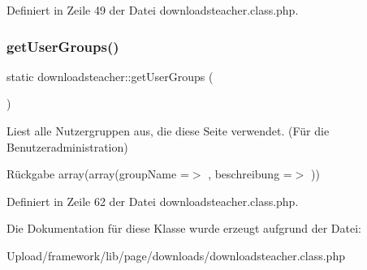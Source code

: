 Definiert in Zeile 49 der Datei downloadsteacher.\+class.\+php.

\mbox{\label{classdownloadsteacher_a5e8bf7c91c94fe97b2bc25dda24a4daf}} 
\subsubsection{\texorpdfstring{get\+User\+Groups()}{getUserGroups()}}
{\footnotesize\ttfamily static downloadsteacher\+::get\+User\+Groups (\begin{DoxyParamCaption}{ }\end{DoxyParamCaption})\hspace{0.3cm}{\ttfamily [static]}}

Liest alle Nutzergruppen aus, die diese Seite verwendet. (Für die Benutzeradministration) \begin{DoxyReturn}{Rückgabe}
array(array(\textquotesingle{}group\+Name\textquotesingle{} =$>$ \textquotesingle{}\textquotesingle{}, \textquotesingle{}beschreibung\textquotesingle{} =$>$ \textquotesingle{}\textquotesingle{})) 
\end{DoxyReturn}


Definiert in Zeile 62 der Datei downloadsteacher.\+class.\+php.



Die Dokumentation für diese Klasse wurde erzeugt aufgrund der Datei\+:\begin{DoxyCompactItemize}
\item 
Upload/framework/lib/page/downloads/downloadsteacher.\+class.\+php\end{DoxyCompactItemize}
